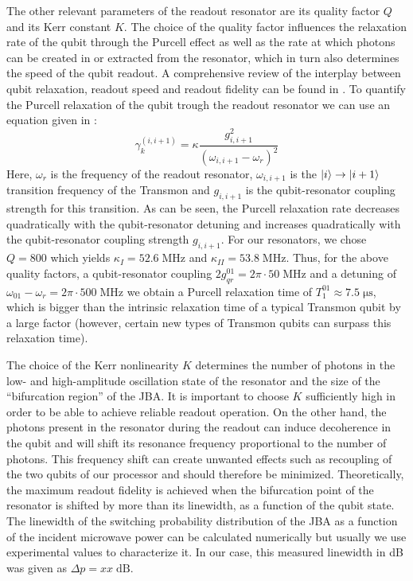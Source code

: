 \smallskip

The other relevant parameters of the readout resonator are its quality factor $Q$ and its Kerr constant $K$. The choice of the quality factor influences the relaxation rate of the qubit through the Purcell effect as well as the rate at which photons can be created in or extracted from the resonator, which in turn also determines the speed of the qubit readout. A comprehensive review of the interplay between qubit relaxation, readout speed and readout fidelity can be found in \cite{mallet_single-shot_2009}. To quantify the Purcell relaxation of the qubit trough the readout resonator we can use an equation given in \citep{koch_charge-insensitive_2007}:
%
\begin{equation}
\gamma_k^{(i,i+1)} = \kappa \frac{g_{i,i+1}^2}{(\omega_{i,i+1}-\omega_r)^2}
\end{equation}
%
Here, $\omega_r$ is the frequency of the readout resonator, $\omega_{i,i+1}$ is the $\left| i \right>\to\left| i+1 \right>$ transition frequency of the Transmon and $g_{i,i+1}$ is the qubit-resonator coupling strength for this transition. As can be seen, the Purcell relaxation rate decreases quadratically with the qubit-resonator detuning and increases quadratically with the qubit-resonator coupling strength $g_{i,i+1}$. For our resonators, we chose $Q=800$ which yields $\kappa_I = 52.6\;\mathrm{MHz}$ and $\kappa_{II} = 53.8\;\mathrm{MHz}$. Thus, for the above quality factors, a qubit-resonator coupling $2g_{qr}^{01}=2\pi \cdot 50\;\mathrm{MHz}$ and a detuning of $\omega_{01}-\omega_r = 2\pi \cdot 500 \;\mathrm{MHz}$ we obtain a Purcell relaxation time of $T_{1}^{01} \approx 7.5\;\mathrm{\mu s}$, which is bigger than the intrinsic relaxation time of a typical Transmon qubit by a large factor (however, certain new types of Transmon qubits can surpass this relaxation time).

\smallskip

The choice of the Kerr nonlinearity $K$ determines the number of photons in the low- and high-amplitude oscillation state of the resonator and the size of the ``bifurcation region'' of the JBA. It is important to choose $K$ sufficiently high in order to be able to achieve reliable readout operation. On the other hand, the photons present in the resonator during the readout can induce decoherence in the qubit and will shift its resonance frequency proportional to the number of photons. This frequency shift can create unwanted effects such as recoupling of the two qubits of our processor and should therefore be minimized. Theoretically, the maximum readout fidelity is achieved when the bifurcation point of the resonator is shifted by more than its linewidth, as a function of the qubit state. The linewidth of the switching probability distribution of the JBA as a function of the incident microwave power can be calculated numerically but usually we use experimental values to characterize it. In our case, this measured linewidth in dB was given as $\Delta p = xx\;\mathrm{dB}$. 

